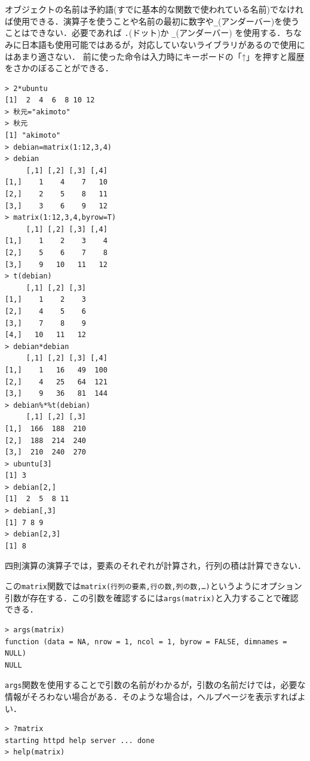 \documentclass[a4paper,10pt,fleqn]{jarticle}
\begin{document}
オブジェクトの名前は予約語(すでに基本的な関数で使われている名前)でなければ使用できる．演算子を使うことや名前の最初に数字や\verb+_+(アンダーバー)を使うことはできない．必要であれば \verb+.+(ドット)か \verb+_+(アンダーバー) を使用する．ちなみに日本語も使用可能ではあるが，対応していないライブラリがあるので使用にはあまり適さない．
前に使った命令は入力時にキーボードの「↑」を押すと履歴をさかのぼることができる．
\begin{breakbox}
\begin{verbatim}
> 2*ubuntu
[1]  2  4  6  8 10 12
> 秋元="akimoto"
> 秋元
[1] "akimoto"
> debian=matrix(1:12,3,4)
> debian
     [,1] [,2] [,3] [,4]
[1,]    1    4    7   10
[2,]    2    5    8   11
[3,]    3    6    9   12
> matrix(1:12,3,4,byrow=T)
     [,1] [,2] [,3] [,4]
[1,]    1    2    3    4
[2,]    5    6    7    8
[3,]    9   10   11   12
> t(debian)
     [,1] [,2] [,3]
[1,]    1    2    3
[2,]    4    5    6
[3,]    7    8    9
[4,]   10   11   12
> debian*debian
     [,1] [,2] [,3] [,4]
[1,]    1   16   49  100
[2,]    4   25   64  121
[3,]    9   36   81  144
> debian%*%t(debian)
     [,1] [,2] [,3]
[1,]  166  188  210
[2,]  188  214  240
[3,]  210  240  270
> ubuntu[3]
[1] 3
> debian[2,]
[1]  2  5  8 11
> debian[,3]
[1] 7 8 9
> debian[2,3]
[1] 8
\end{verbatim}
\end{breakbox}

四則演算の演算子では，要素のそれぞれが計算され，行列の積は計算できない．

この{\tt matrix}関数では\verb+matrix(行列の要素,行の数,列の数,…)+というようにオプション引数が存在する．この引数を確認するには\verb+args(matrix)+と入力することで確認できる．
\begin{breakbox}
\begin{verbatim}
> args(matrix)
function (data = NA, nrow = 1, ncol = 1, byrow = FALSE, dimnames = NULL) 
NULL
\end{verbatim}
\end{breakbox}

{\tt args}関数を使用することで引数の名前がわかるが，引数の名前だけでは，必要な情報がそろわない場合がある．そのような場合は，ヘルプページを表示すればよい．
\begin{breakbox}
\begin{verbatim}
> ?matrix
starting httpd help server ... done
> help(matrix)
\end{verbatim}
\end{breakbox}
\end{document}
